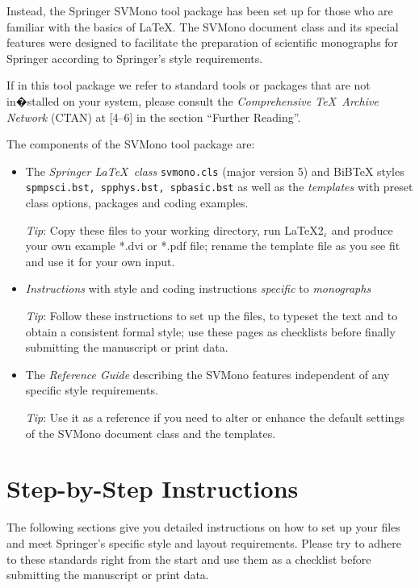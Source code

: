 \documentclass[graybox]{svmono}
\begin{document}
\pagebreak

Instead, the Springer {\sc SVMono} tool package has been set up for those who are familiar with the basics of \LaTeX. The {\sc SVMono} document class and its special features were designed to facilitate the preparation of scientific monographs for Springer according to Springer's style requirements.

If in this tool package we refer to standard tools or packages that are not in�stalled on your system, please consult the {\it Comprehensive \TeX\ Archive Network} (CTAN) at [4--6] in the section ``Further Reading''.

The components of the {\sc SVMono} tool package are:

\begin{itemize}
\item The {\it Springer \LaTeX~class} {\tt svmono.cls} (major version 5) and BiBTeX styles {\tt spmpsci.bst, spphys.bst, spbasic.bst} as well as the {\it templates} with preset class options, packages and coding examples.

{\it Tip}: Copy these files to your working directory, run \LaTeX2$_\varepsilon$ and produce your own example *.dvi or *.pdf file; rename the template file as you see fit and use it for your own input.

\item {\it Instructions} with style and coding instructions {\it specific} to {\it monographs}

{\it Tip}: Follow these instructions to set up the files, to typeset the text and to obtain a consistent formal style; use these pages as checklists before finally submitting the manuscript or print data.

\item The {\it Reference Guide} describing the {\sc SVMono} features independent of any specific style requirements.

{\it Tip}: Use it as a reference if you need to alter or enhance the default settings of the {\sc SVMono} document class and the templates.
\end{itemize}

\section{ Step-by-Step Instructions}

The following sections give you detailed instructions on how to set up your files and meet Springer's specific style and layout requirements. Please try to adhere to these standards right from the start and use them as a checklist before submitting the manuscript or print data.
\end{document}

